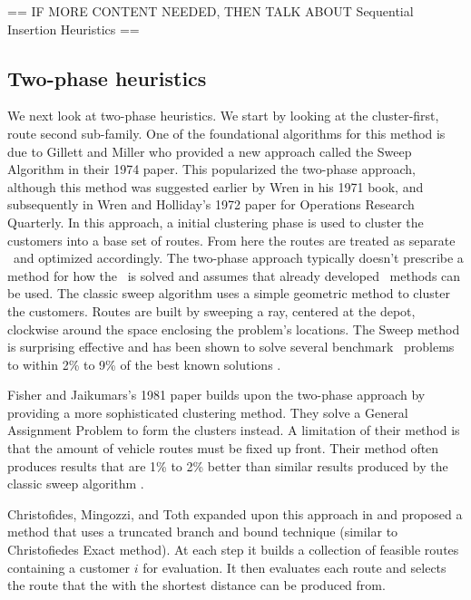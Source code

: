 == IF MORE CONTENT NEEDED, THEN TALK ABOUT Sequential Insertion Heuristics ==


\subsection{Two-phase heuristics}
\label{sec:tph}

We next look at two-phase heuristics. We start by looking at the cluster-first, route second sub-family. One of the foundational algorithms for this method is due to Gillett and Miller who provided a new approach called the Sweep Algorithm in their 1974 paper\cite{GM:1974}. This popularized the two-phase approach, although this method was suggested earlier by Wren in his 1971 book, and subsequently in Wren and Holliday's 1972 paper for Operations Research Quarterly. In this approach, a initial clustering phase is used to cluster the customers into a base set of routes. From here the routes are treated as separate \TSP\ and optimized accordingly. The two-phase approach typically doesn't prescribe a method for how the \TSP\ is solved and assumes that already developed \TSP\ methods can be used. The classic sweep algorithm uses a simple geometric method to cluster the customers. Routes are built by sweeping a ray, centered at the depot, clockwise around the space enclosing the problem's locations. The Sweep method is surprising effective and has been shown to solve several benchmark \VRP\ problems to within 2\% to 9\% of the best known solutions \cite{TV2001}.


Fisher and Jaikumars's 1981 paper \cite{FJ:1981} builds upon the two-phase approach by providing a more sophisticated clustering method. They solve a General Assignment Problem to form the clusters instead. A limitation of their method is that the amount of vehicle routes must be fixed up front. Their method often produces results that are 1\% to 2\% better than similar results produced by the classic sweep algorithm \cite{TV2001}. 

Christofides, Mingozzi, and Toth expanded upon this approach in \cite{???} and proposed a method that uses a truncated branch and bound technique (similar to Christofiedes Exact method). At each step it builds a collection of feasible routes containing a customer $i$ for evaluation. It then evaluates each route and selects the route that the \TSP with the shortest distance can be produced from.

